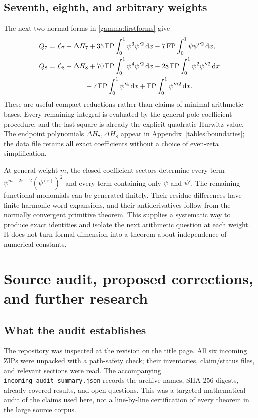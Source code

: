 \documentclass[11pt,a4paper]{article}
\numberwithin{equation}{section}
\theoremstyle{definition}
\theoremstyle{remark}
\DeclareMathOperator{\FP}{FP}
\newcommand{\dd}{\,\mathrm d}
\begin{document}
\subsection{Seventh, eighth, and arbitrary weights}

The next two normal forms in \eqref{gamma:firstforms} give
\begin{align}
 Q_7={}&\mathcal L_7-\Delta H_7
    +35\FP\int_0^1\psi^3\psi'^2\dd x
    -7\FP\int_0^1\psi\psi''^2\dd x,\label{sixth:Q7}\\
 Q_8={}&\mathcal L_8-\Delta H_8
    +70\FP\int_0^1\psi^4\psi'^2\dd x
    -28\FP\int_0^1\psi^2\psi''^2\dd x\notag\\
 &\hspace{14mm}+7\FP\int_0^1\psi'^4\dd x
    +\FP\int_0^1\psi'''^2\dd x.\label{sixth:Q8}
\end{align}
These are useful compact reductions rather than claims of minimal
arithmetic bases.  Every remaining integral is evaluated by the
general pole-coefficient procedure, and the last square is already
the explicit quadratic Hurwitz value.
The endpoint polynomials $\Delta H_7,\Delta H_8$ appear in
Appendix~\ref{tables:boundaries}; the data file retains all exact
coefficients without a choice of even-zeta simplification.

At general weight $m$, the closed coefficient sectors determine every
term $\psi^{m-2r-2}(\psi^{(r)})^2$ and every term containing only
$\psi$ and $\psi'$.  The remaining functional monomials can be
generated finitely.  Their residue differences have finite harmonic
word expansions, and their antiderivatives follow from the normally
convergent primitive theorem.  This supplies a systematic way to
produce exact identities and isolate the next arithmetic question at
each weight.  It does not turn formal dimension into a theorem about
independence of numerical constants.



\section{Source audit, proposed corrections, and further research}
\label{audit:sec}

\subsection{What the audit establishes}

The repository was inspected at the revision on the title page.
All six incoming ZIPs were unpacked with a path-safety check; their
inventories, claim/status files, and relevant sections were read.
The accompanying \texttt{incoming\_audit\_summary.json} records the
archive names, SHA-256 digests, already covered results, and open
questions.  This was a targeted mathematical audit of the claims
used here, not a line-by-line certification of every theorem in the
large source corpus.
\end{document}
